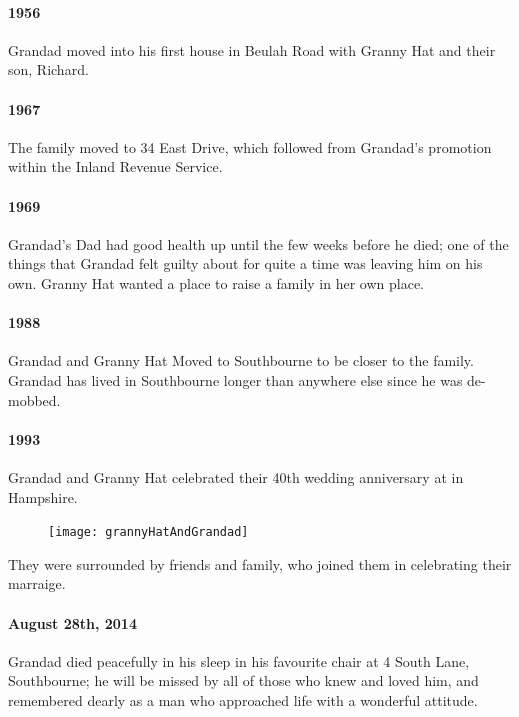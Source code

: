 \paragraph{1956} Grandad moved into his first house in Beulah Road with Granny Hat and their son, Richard.
\paragraph{1967} The family moved to 34 East Drive, which followed from Grandad's promotion within
the Inland Revenue Service.
\paragraph{1969} Grandad's Dad had good health up until the few weeks before he died; one
of the things that Grandad felt guilty about for quite a time was leaving him on his own. Granny Hat  wanted
a place to raise a family in her own place.
\paragraph{1988} Grandad and Granny Hat Moved to Southbourne to be closer to the family. Grandad
has lived in Southbourne longer than anywhere else since he was de-mobbed.

\paragraph{1993} Grandad and Granny Hat celebrated their 40th wedding anniversary
at  in Hampshire.

\begin{figure}
	\centering
	\texttt{[image: grannyHatAndGrandad]}
\end{figure}
They were surrounded by friends and family, who joined them in celebrating their
marraige.

\paragraph{August 28th, 2014} Grandad died peacefully in his sleep in his favourite chair at 4 South Lane, Southbourne; he will be missed by all of those
who knew and loved him, and remembered dearly as a man who approached life with a wonderful attitude.

\clearpage


